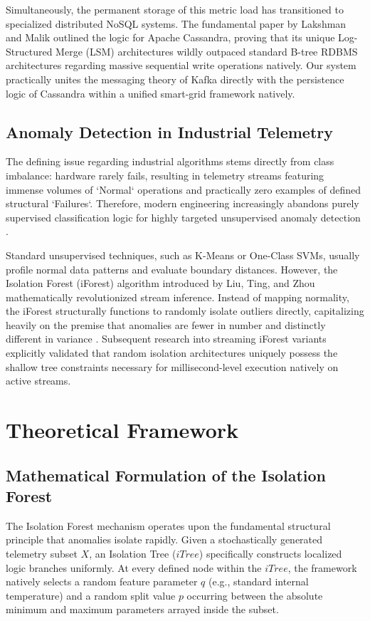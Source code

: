 \documentclass[12pt, a4paper]{article}
\begin{document}
Simultaneously, the permanent storage of this metric load has transitioned to specialized distributed NoSQL systems. The fundamental paper by Lakshman and Malik \cite{Lakshman2010} outlined the logic for Apache Cassandra, proving that its unique Log-Structured Merge (LSM) architectures wildly outpaced standard B-tree RDBMS architectures regarding massive sequential write operations natively. Our system practically unites the messaging theory of Kafka directly with the persistence logic of Cassandra within a unified smart-grid framework natively.

\subsection{Anomaly Detection in Industrial Telemetry}
The defining issue regarding industrial algorithms stems directly from class imbalance: hardware rarely fails, resulting in telemetry streams featuring immense volumes of `Normal` operations and practically zero examples of defined structural `Failures`. Therefore, modern engineering increasingly abandons purely supervised classification logic for highly targeted unsupervised anomaly detection \cite{Chalapathy2019}. 

Standard unsupervised techniques, such as K-Means or One-Class SVMs, usually profile normal data patterns and evaluate boundary distances. However, the Isolation Forest (iForest) algorithm introduced by Liu, Ting, and Zhou \cite{Liu2008} mathematically revolutionized stream inference. Instead of mapping normality, the iForest structurally functions to randomly isolate outliers directly, capitalizing heavily on the premise that anomalies are fewer in number and distinctly different in variance \cite{Mueller2016}. Subsequent research into streaming iForest variants \cite{Hariri2019} explicitly validated that random isolation architectures uniquely possess the shallow tree constraints necessary for millisecond-level execution natively on active streams.

\section{Theoretical Framework}

\subsection{Mathematical Formulation of the Isolation Forest}
The Isolation Forest mechanism operates upon the fundamental structural principle that anomalies isolate rapidly. Given a stochastically generated telemetry subset $X$, an Isolation Tree ($iTree$) specifically constructs localized logic branches uniformly. At every defined node within the $iTree$, the framework natively selects a random feature parameter $q$ (e.g., standard internal temperature) and a random split value $p$ occurring between the absolute minimum and maximum parameters arrayed inside the subset.
\end{document}
